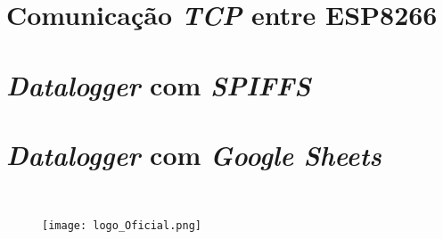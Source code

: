 \documentclass[
	11pt,				%
	openright,			%
	twoside,			%
	a5paper,			%
	english,			%
	french,				%
	spanish,			%
	brazil,				%
	sumario=tradicional
]{abntex2}
\begin{document}
\newpage

\section{Comunicação \textit{TCP} entre ESP8266}

\newpage



\section{\textit{Datalogger} com \textit{SPIFFS}}

\newpage

\section{\textit{Datalogger} com  \textit{Google Sheets}}




\postextual %


\cleardoublepage
\thispagestyle{empty} 


~\vfill \begin{figure}[b]
    \centering
    \hspace{28pt}    \texttt{[image: logo\_Oficial.png]}
    \label{fig:my_label}
\end{figure}
\end{document}
